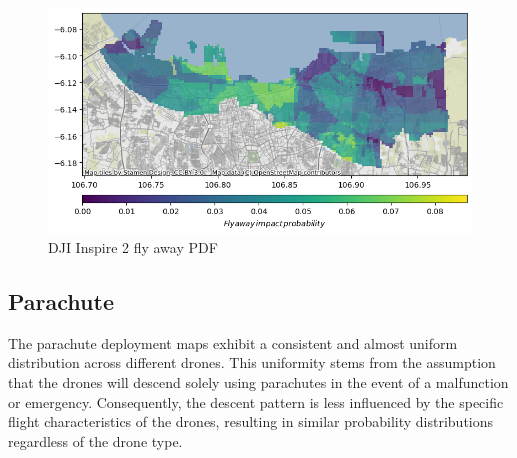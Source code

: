 \documentclass[12pt]{report}
\begin{document}
        \begin{figure}[H]
            \centering
            \includegraphics[width=\textwidth]{Plot/inspire/fly_away_pdf.png}
            \caption{DJI Inspire 2 fly away PDF}
        \end{figure}

        \subsection{Parachute}
        The parachute deployment maps exhibit a consistent and almost uniform distribution across different drones. This
        uniformity stems from the assumption that the drones will descend solely using parachutes in the event of a
        malfunction or emergency. Consequently, the descent pattern is less influenced by the specific flight
        characteristics of the drones, resulting in similar probability distributions regardless of the drone type.
            
\end{document}
